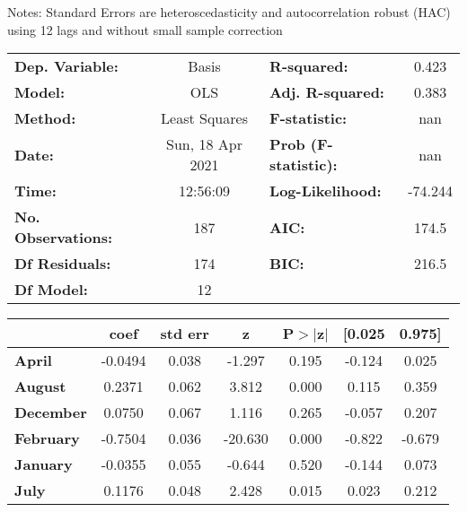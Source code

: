 Notes: \newline
 [1] Standard Errors are heteroscedasticity and autocorrelation robust (HAC) using 12 lags and without small sample correction
\begin{center}
\begin{tabular}{lclc}
\toprule
\textbf{Dep. Variable:}    &      Basis       & \textbf{  R-squared:         } &     0.423   \\
\textbf{Model:}            &       OLS        & \textbf{  Adj. R-squared:    } &     0.383   \\
\textbf{Method:}           &  Least Squares   & \textbf{  F-statistic:       } &       nan   \\
\textbf{Date:}             & Sun, 18 Apr 2021 & \textbf{  Prob (F-statistic):} &      nan    \\
\textbf{Time:}             &     12:56:09     & \textbf{  Log-Likelihood:    } &   -74.244   \\
\textbf{No. Observations:} &         187      & \textbf{  AIC:               } &     174.5   \\
\textbf{Df Residuals:}     &         174      & \textbf{  BIC:               } &     216.5   \\
\textbf{Df Model:}         &          12      & \textbf{                     } &             \\
\bottomrule
\end{tabular}
\begin{tabular}{lcccccc}
                   & \textbf{coef} & \textbf{std err} & \textbf{z} & \textbf{P$> |$z$|$} & \textbf{[0.025} & \textbf{0.975]}  \\
\midrule
\textbf{April}     &      -0.0494  &        0.038     &    -1.297  &         0.195        &       -0.124    &        0.025     \\
\textbf{August}    &       0.2371  &        0.062     &     3.812  &         0.000        &        0.115    &        0.359     \\
\textbf{December}  &       0.0750  &        0.067     &     1.116  &         0.265        &       -0.057    &        0.207     \\
\textbf{February}  &      -0.7504  &        0.036     &   -20.630  &         0.000        &       -0.822    &       -0.679     \\
\textbf{January}   &      -0.0355  &        0.055     &    -0.644  &         0.520        &       -0.144    &        0.073     \\
\textbf{July}      &       0.1176  &        0.048     &     2.428  &         0.015        &        0.023    &        0.212     \\

\end{tabular}
\end{center}

